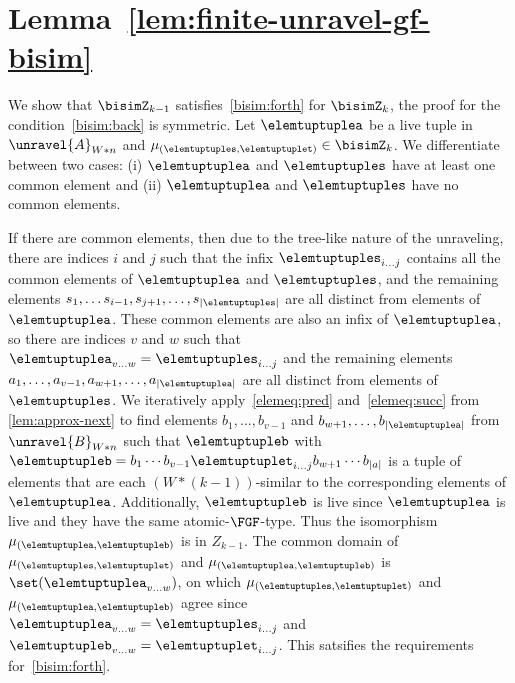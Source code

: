   \section{Lemma~\ref{lem:finite-unravel-gf-bisim}}
  \finiteUnravelGfBisim*
\fi
\ifmainpart
\begin{proofsketch}
  We show that $\bisimZ_{k-1}$ satisfies~\ref{bisim:forth} for $\bisimZ_{k}$, the proof for the condition~\ref{bisim:back} is symmetric.
  Let $\elemtuptuplea$ be a live tuple in $\unravel{A}_{W * n}$ and $\mu_{(\elemtuptuples, \elemtuptuplet)} \in \bisimZ_{k}$.
  We differentiate between two cases: (i) $\elemtuptuplea$ and $\elemtuptuples$ have at least one common element and (ii) $\elemtuptuplea$ and $\elemtuptuples$ have no common elements.
  \begin{romanenumerate}
    \item
    If there are common elements, then due to the tree-like nature of the unraveling, there are indices $i$ and $j$ such that the infix $\elemtuptuples_{i\ldots{}j}$ contains all the common elements of $\elemtuptuplea$ and $\elemtuptuples$, and the remaining elements $s_{1}, \ldots s_{i-1}, s_{j+1}, \ldots, s_{|\elemtuptuples|}$ are all distinct from elements of $\elemtuptuplea$.
    These common elements are also an infix of $\elemtuptuplea$, so there are indices $v$ and $w$ such that $\elemtuptuplea_{v\ldots{}w} = \elemtuptuples_{i\ldots{}j}$ and the remaining elements $a_1, \ldots, a_{v-1}, a_{w+1}, \ldots, a_{|\elemtuptuplea|}$ are all distinct from elements of $\elemtuptuples$.
    We iteratively apply~\ref{elemeq:pred} and~\ref{elemeq:succ} from \cref{lem:approx-next} to find elements $b_{1}, \ldots, b_{v-1}$ and $b_{w+1}, \ldots, b_{|\elemtuptuplea|}$ from $\unravel{B}_{W * n}$ such that $\elemtuptupleb$ with $\elemtuptupleb = b_{1}\cdots{}b_{v-1}\elemtuptuplet_{i\ldots{}j}b_{w+1}\cdots{}b_{|a|}$ is a tuple of elements that are each $(W*(k-1))$-similar to the corresponding elements of $\elemtuptuplea$.
    Additionally, $\elemtuptupleb$ is live since $\elemtuptuplea$ is live and they have the same atomic-$\FGF$-type.
    Thus the isomorphism $\mu_{(\elemtuptuplea,\elemtuptupleb)}$ is in $Z_{k-1}$.
    The common domain of $\mu_{(\elemtuptuples,\elemtuptuplet)}$ and $\mu_{(\elemtuptuplea,\elemtuptupleb)}$ is $\set(\elemtuptuplea_{v\ldots{}w})$, on which $\mu_{(\elemtuptuples,\elemtuptuplet)}$ and $\mu_{(\elemtuptuplea,\elemtuptupleb)}$ agree since $\elemtuptuplea_{v\ldots{}w} = \elemtuptuples_{i\ldots{}j}$ and $\elemtuptupleb_{v\ldots{}w} = \elemtuptuplet_{i\ldots{}j}$.
    This satsifies the requirements for~\ref{bisim:forth}.


\end{romanenumerate}
\end{proofsketch}
